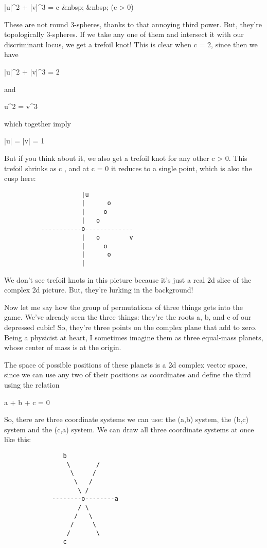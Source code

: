 |u|^{2} + |v|^{3} = c     &nbsp; &nbsp;            (c > 0)

These are not round 3-spheres, thanks to that annoying third power.
But, they're topologically 3-spheres.  If we take any one of them 
and intersect it with our discriminant locus, we get a trefoil knot!  
This is clear when c = 2, since then we have

|u|^{2} + |v|^{3} = 2

and 

u^{2} = v^{3}

which together imply 

|u| = |v| = 1

But if you think about it, we also get a trefoil knot for any other
c > 0.  This trefoil shrinks as c , and at c = 0 it reduces to a 
single point, which is also the cusp here:

\begin{verbatim}
                     |u         
                     |      o
                     |     o
                     |   o
          -----------o-------------
                     |   o        v
                     |     o
                     |      o
                     |          
\end{verbatim}
    
We don't see trefoil knots in this picture because it's just a
real 2d slice of the complex 2d picture.  But, they're lurking in
the background!  

Now let me say how the group of permutations of three things
gets into the game.  We've already seen the three things: they're 
the roots a, b, and c of our depressed cubic!  So, they're three
points on the complex plane that add to zero.  Being a physicist
at heart, I sometimes imagine them as three equal-mass planets, 
whose center of mass is at the origin.

The space of possible positions of these planets is a 2d complex
vector space, since we can use any two of their positions as 
coordinates and define the third using the relation

a + b + c = 0

So, there are three coordinate systems we can use: the (a,b)
system, the (b,c) system and the (c,a) system.  We can draw all 
three coordinate systems at once like this:

\begin{verbatim}
                b         
                 \       /
                  \     /
                   \   /
                    \ /
             --------o--------a
                    / \
                   /   \
                  /     \
                 /       \
                c
\end{verbatim}
    
